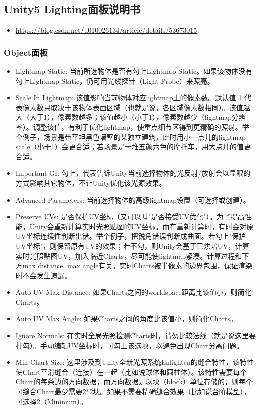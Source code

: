 \documentclass[9pt, b5paper]{article}
\begin{document}
\subsection{Unity5 Lighting面板说明书}
\label{sec:org6aa22d1}
\begin{itemize}
\item \url{https://blog.csdn.net/u010026134/article/details/53673015}
\end{itemize}
\subsubsection{Object面板}
\label{sec:org20a2a34}
\begin{itemize}
\item Lightmap Static: 当前所选物体是否有勾上Lightmap Static。如果该物体没有勾上Lightmap Static，仍可用光线探针（Light Probe）来照亮。
\item Scale In Lightmap: 该值影响当前物体对应lightmap上的像素数。默认值 1 代表像素数只取决于该物体表面区域（也就是说，各区域像素数相同）。该值越大（大于1），像素数越多；该值越小（小于1），像素数越少（lightmap分辨率）。调整该值，有利于优化lightmap，使重点细节区得到更精确的照射。举个例子，场景是带平坦黑色墙壁的某独立建筑，此时用小一点儿的lightmap scale（小于1）会更合适；若场景是一堆五颜六色的摩托车，用大点儿的值更合适。
\item Important GI: 勾上，代表告诉Unity当前选择物体的光反射/放射会以显眼的方式影响其它物体，不让Unity优化该光源效果。
\item Advanced Parameters: 当前选择物体的高级lightmap设置（可选择或创建）。
\item Preserve UVs: 是否保护UV坐标（又可以叫"是否接受UV优化"）。为了提高性能，Unity会重新计算实时光照贴图的UV坐标。而在重新计算时，有时会对原UV坐标连续性判断出错。举个例子，把锐角错误判断成曲面。若勾上"保护UV坐标"，则保留原有UV的效果；若不勾，则Unity会基于已烘培UV，计算实时光照贴图UV，加入临近Charts，尽可能使lightmap紧凑。计算过程和下方max distance, max angle有关。实时Charts被半像素的边界包围，保证渲染时不会发生遗漏。
\item Auto UV Max Distance: 如果Charts之间的worldspace距离比该值小，则简化Charts。
\item Auto UV Max Angle: 如果Charts之间的角度比该值小，则简化Charts。
\item Ignore Normals: 在实时全局光照检测Charts时，请勿比较法线（就是说这里要打勾）。手动编辑UV坐标时，可勾上该选项，以避免出现Chart分离问题。
\item Min Chart Size: 这里涉及到Unity全新光照系统Enlighten的缝合特性，该特性使Chart平滑缝合（连接）在一起（比如说球体和圆柱体）。该特性需要每个Chart的每条边的方向数据，而方向数据是以块（block）单位存储的，则每个可缝合Chart最少需要2*2块。如果不需要精确缝合效果（比如说台阶模型），可选择2（Minimum）。


\end{itemize}
\end{document}

